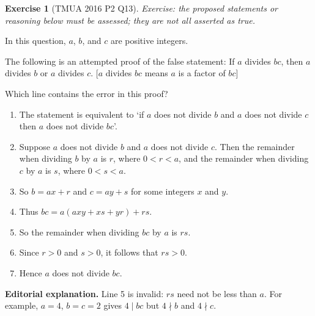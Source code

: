 \documentclass[11pt]{article}
\theoremstyle{definition}
\newtheorem{example}[theorem]{Exercise}
\theoremstyle{remark}
\newcommand{\pqty}[1]{\left(#1\right)}
\begin{document}
\begin{example}[TMUA 2016 P2 Q13]\label{tmua-6-unit-026}
\textit{Exercise: the proposed statements or reasoning below must be assessed; they are not all asserted as true.}\par

    In this question, \(a\), \(b\), and \(c\) are positive integers.

    The following is an attempted proof of the false statement: If \(a\) divides \(bc\), then \(a\) divides \(b\) or \(a\) divides \(c\). [\(a\) divides \(bc\) means \(a\) is a factor of \(bc\)]

    Which line contains the error in this proof?

    \begin{enumerate}
        \item The statement is equivalent to `if \(a\) does not divide \(b\) and \(a\) does not divide \(c\) then \(a\) does not divide \(bc\)'.
        \item Suppose \(a\) does not divide \(b\) and \(a\) does not divide \(c\). Then the remainder when dividing \(b\) by \(a\) is \(r\), where \(0 < r < a\), and the remainder when dividing \(c\) by \(a\) is \(s\), where \(0 < s < a\).
        \item So \(b = ax + r\) and \(c = ay + s\) for some integers \(x\) and \(y\).
        \item Thus \(bc = a \pqty{axy + xs + yr} + rs\).
        \item So the remainder when dividing \(bc\) by \(a\) is \(rs\).
        \item Since \(r > 0\) and \(s > 0\), it follows that \(rs > 0\).
        \item Hence \(a\) does not divide \(bc\).
    \end{enumerate}

\textbf{Editorial explanation.} Line 5 is invalid: \(rs\) need not be less than \(a\). For example, \(a=4\), \(b=c=2\) gives \(4\mid bc\) but \(4\nmid b\) and \(4\nmid c\).
\end{example}
\end{document}
